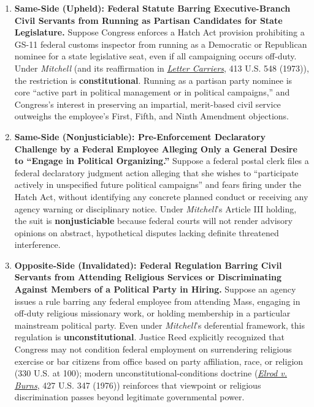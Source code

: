 \documentclass[12pt]{article}
\begin{document}
\begin{enumerate}
\item \textbf{Same-Side (Upheld): Federal Statute Barring Executive-Branch Civil Servants from Running as Partisan Candidates for State Legislature.} Suppose Congress enforces a Hatch Act provision prohibiting a GS-11 federal customs inspector from running as a Democratic or Republican nominee for a state legislative seat, even if all campaigning occurs off-duty. Under \textit{Mitchell} (and its reaffirmation in \href{https://www.law.cornell.edu/supremecourt/text/413/548}{\textit{Letter Carriers}}, 413 U.S. 548 (1973)), the restriction is \textbf{constitutional}. Running as a partisan party nominee is core ``active part in political management or in political campaigns,'' and Congress's interest in preserving an impartial, merit-based civil service outweighs the employee's First, Fifth, and Ninth Amendment objections.
\item \textbf{Same-Side (Nonjusticiable): Pre-Enforcement Declaratory Challenge by a Federal Employee Alleging Only a General Desire to ``Engage in Political Organizing.''} Suppose a federal postal clerk files a federal declaratory judgment action alleging that she wishes to ``participate actively in unspecified future political campaigns'' and fears firing under the Hatch Act, without identifying any concrete planned conduct or receiving any agency warning or disciplinary notice. Under \textit{Mitchell}'s Article III holding, the suit is \textbf{nonjusticiable} because federal courts will not render advisory opinions on abstract, hypothetical disputes lacking definite threatened interference.
\item \textbf{Opposite-Side (Invalidated): Federal Regulation Barring Civil Servants from Attending Religious Services or Discriminating Against Members of a Political Party in Hiring.} Suppose an agency issues a rule barring any federal employee from attending Mass, engaging in off-duty religious missionary work, or holding membership in a particular mainstream political party. Even under \textit{Mitchell}'s deferential framework, this regulation is \textbf{unconstitutional}. Justice Reed explicitly recognized that Congress may not condition federal employment on surrendering religious exercise or bar citizens from office based on party affiliation, race, or religion (330 U.S. at 100); modern unconstitutional-conditions doctrine (\href{https://www.law.cornell.edu/supremecourt/text/427/347}{\textit{Elrod v. Burns}}, 427 U.S. 347 (1976)) reinforces that viewpoint or religious discrimination passes beyond legitimate governmental power.

\end{enumerate}
\end{document}
